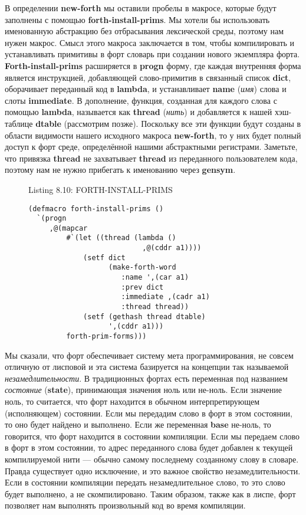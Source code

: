 В определении \textbf{new-forth} мы оставили пробелы в макросе, которые будут заполнены с помощью \textbf{forth-install-prims}. Мы хотели бы использовать именованную абстракцию без отбрасывания лексической среды, поэтому нам нужен макрос. Смысл этого макроса заключается в том, чтобы компилировать и устанавливать примитивы в форт словарь при создании нового экземпляра форта. \textbf{Forth-install-prims} расширяется в \textbf{progn} форму, где каждая внутренняя форма является инструкцией, добавляющей слово-примитив в связанный список \textbf{dict}, оборачивает переданный код в \textbf{lambda}, и устанавливает \textbf{name} (\emph{имя}) слова и слоты \textbf{immediate}. В дополнение, функция, созданная для каждого слова с помощью \textbf{lambda}, называется как \textbf{thread} (\emph{нить}) и добавляется к нашей хэш-таблице \textbf{dtable} (рассмотрим позже). Поскольку все эти функции будут созданы в области видимости нашего исходного макроса \textbf{new-forth}, то у них будет полный доступ к форт среде, определённой нашими абстрактными регистрами. Заметьте, что привязка \textbf{thread} не захватывает \textbf{thread} из переданного пользователем кода, поэтому нам не нужно прибегать к именованию через \textbf{gensym}.


\begin{figure}Listing 8.10: FORTH-INSTALL-PRIMS\label{listing_8.10}
\listbegin
\begin{verbatim}
(defmacro forth-install-prims ()
  `(progn
     ,@(mapcar
         #`(let ((thread (lambda ()
                           ,@(cddr a1))))
             (setf dict
                   (make-forth-word
                      :name ',(car a1)
                      :prev dict
                      :immediate ,(cadr a1)
                      :thread thread))
             (setf (gethash thread dtable)
                   ',(cddr a1)))
         forth-prim-forms)))
\end{verbatim}
\listend
\end{figure}

Мы сказали, что форт обеспечивает систему мета программирования, не совсем отличную от лисповой и эта система базируется на концепции так называемой \emph{незамедлительности}. В традиционных фортах есть переменная под названием \emph{состояние} (\textbf{state}), принимающая значения ноль или не-ноль. Если значение ноль, то считается, что форт находится в обычном интерпретирующем (исполняющем) состоянии. Если мы передадим слово в форт в этом состоянии, то оно будет найдено и выполнено. Если же переменная \textbf{base} не-ноль, то говорится, что форт находится в состоянии компиляции. Если мы передаем слово в форт в этом состоянии, то адрес переданного слова будет добавлен к текущей компилируемой нити --- обычно самому последнему созданному слову в словаре. Правда существует одно исключение, и это важное свойство незамедлительности. Если в состоянии компиляции передать незамедлительное слово, то это слово будет выполнено, а не скомпилировано. Таким образом, также как в лиспе, форт позволяет нам выполнять произвольный код во время компиляции.

